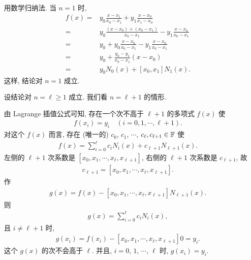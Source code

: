 \begin{pf}
    用数学归纳法. 当 $n=1$ 时,
    \begin{align*}
        f(x)
        = {} & y_0 \frac{x - x_1}{x_0 - x_1}
        + y_1 \frac{x - x_0}{x_1 - x_0}                      \\
        = {} & y_0 \frac{(x - x_0) + (x_0 - x_1)}{x_0 - x_1}
        - y_1 \frac{x - x_0}{x_0 - x_1}                      \\
        = {} & y_0 + y_0 \frac{x - x_0}{x_0 - x_1}
        - y_1 \frac{x - x_0}{x_0 - x_1}                      \\
        = {} & y_0 + \frac{y_0 - y_1}{x_0 - x_1} (x - x_0)   \\
        = {} & y_0 N_0 (x) + [x_0, x_1] N_1 (x).
    \end{align*}
    这样, 结论对 $n=1$ 成立.

    设结论对 $n = \ell \geq 1$ 成立. 我们看 $n = \ell + 1$ 的情形.

    由 Lagrange 插值公式可知, 存在一个次不高于 $\ell + 1$ 的多项式 $f(x)$ 使
    \begin{align*}
        f(x_i) = y_i \quad (i = 0,1,\cdots,\ell + 1).
    \end{align*}
    对这个 $f(x)$ 而言, 存在 (唯一的) $c_0$, $c_1$, $\cdots$, $c_{\ell}, c_{\ell + 1} \in \mathbb{F}$ 使
    \begin{align*}
        f(x) = \sum_{i = 0}^{\ell} c_i N_{i} (x) + c_{\ell + 1} N_{\ell + 1} (x).
    \end{align*}
    左侧的 $\ell + 1$ 次系数是 $[x_0, x_1, \cdots, x_\ell, x_{\ell + 1}]$, 右侧的 $\ell + 1$ 次系数是 $c_{\ell + 1}$, 故
    \begin{align*}
        c_{\ell + 1} = [x_0, x_1, \cdots, x_\ell, x_{\ell + 1}].
    \end{align*}
    作
    \begin{align*}
        g(x) = f(x) - [x_0, x_1, \cdots, x_\ell, x_{\ell + 1}] N_{\ell + 1} (x).
    \end{align*}
    则
    \begin{align*}
        g(x) = \sum_{i = 0}^{\ell} c_i N_{i} (x),
    \end{align*}
    且 $i \neq \ell + 1$ 时,
    \begin{align*}
        g(x_i) = f(x_i) - [x_0, x_1, \cdots, x_\ell, x_{\ell + 1}] 0 = y_i.
    \end{align*}
    这个 $g(x)$ 的次不会高于 $\ell$. 并且, $i = 0$, $1$, $\cdots$, $\ell$ 时, $g(x_i) = y_i$.


\end{pf}
